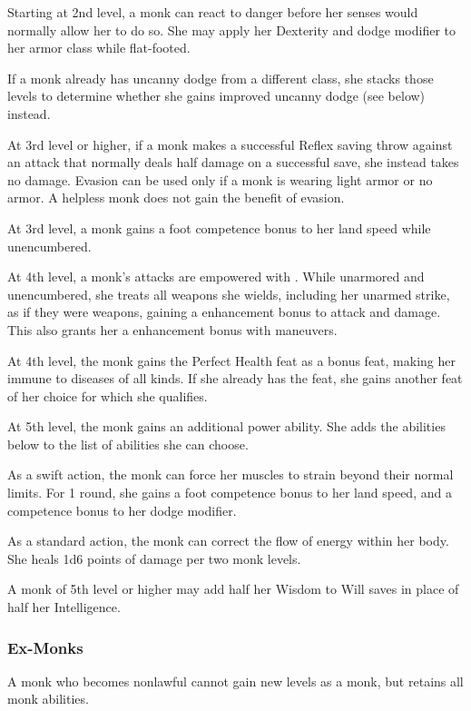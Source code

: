  Starting at 2nd level, a monk can react to danger before her senses would normally allow her to do so. She may apply her Dexterity and dodge modifier to her armor class while flat-footed.

If a monk already has uncanny dodge from a different class, she stacks those levels to determine whether she gains improved uncanny dodge (see below) instead.

 At 3rd level or higher, if a monk makes a successful Reflex saving throw against an attack that normally deals half damage on a successful save, she instead takes no damage. Evasion can be used only if a monk is wearing light armor or no armor. A helpless monk does not gain the benefit of evasion.

 At 3rd level, a monk gains a  foot competence bonus to her land speed while unencumbered.

 At 4th level, a monk's attacks are empowered with \ki. While unarmored and unencumbered, she treats all weapons she wields, including her unarmed strike, as if they were  weapons, gaining a  enhancement bonus to attack and damage. This also grants her a  enhancement bonus with maneuvers. 

 At 4th level, the monk gains the Perfect Health feat as a bonus feat, making her immune to diseases of all kinds. If she already has the feat, she gains another feat of her choice for which she qualifies.

 At 5th level, the monk gains an additional \ki power ability. She adds the abilities below to the list of abilities she can choose.

 As a swift action, the monk can force her muscles to strain beyond their normal limits. For 1 round, she gains a  foot competence bonus to her land speed, and a  competence bonus to her dodge modifier.

 As a standard action, the monk can correct the flow of energy within her body. She heals 1d6 points of damage per two monk levels.

 A monk of 5th level or higher may add half her Wisdom to Will saves in place of half her Intelligence.

\subsubsection{Ex-Monks}
A monk who becomes nonlawful cannot gain new levels as a monk, but retains all monk abilities.

